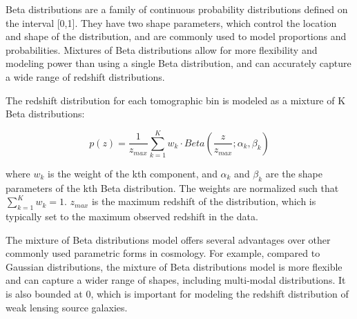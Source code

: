 \documentclass[twocolumn]{aastex631}
\begin{document}
Beta distributions are a family of continuous probability distributions defined on the interval [0,1]. They have two shape parameters, which control the location and shape of the distribution, and are commonly used to model proportions and probabilities. Mixtures of Beta distributions allow for more flexibility and modeling power than using a single Beta distribution, and can accurately capture a wide range of redshift distributions.

The redshift distribution for each tomographic bin is modeled as a mixture of K Beta distributions:

\begin{equation}
p(z) = \frac{1}{z_{max}} \sum_{k=1}^{K} w_k \cdot Beta\left(\frac{z}{z_{max}}; \alpha_k, \beta_k\right)
\end{equation}

where $w_k$ is the weight of the kth component, and $\alpha_k$ and $\beta_k$ are the shape parameters of the kth Beta distribution. The weights are normalized such that $\sum_{k=1}^{K} w_k = 1$. $z_{max}$ is the maximum redshift of the distribution, which is typically set to the maximum observed redshift in the data.

The mixture of Beta distributions model offers several advantages over other commonly used parametric forms in cosmology. For example, compared to Gaussian distributions, the mixture of Beta distributions model is more flexible and can capture a wider range of shapes, including multi-modal distributions. It is also bounded at 0, which is important for modeling the redshift distribution of weak lensing source galaxies.



\end{document}
